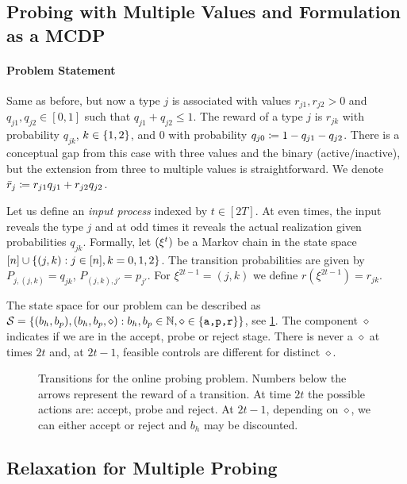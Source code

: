 \subsection{Probing with Multiple Values and Formulation as a MCDP}

\paragraph{Problem Statement}
Same as before, but now a type $j$ is associated with values $r_{j1},r_{j2}>0$ and $q_{j1},q_{j2}\in[0,1]$ such that $q_{j1}+q_{j2}\leq 1$.
The reward of a type $j$ is $r_{jk}$ with probability $q_{jk}$, $k\in\{1,2\}$, and $0$ with probability $q_{j0}\coloneqq1-q_{j1}-q_{j2}$.
There is a conceptual gap from this case with three values and the binary (active/inactive), but the extension from three to multiple values is straightforward.
We denote $\bar r_j\coloneqq r_{j1}q_{j1}+r_{j2}q_{j2}$.

Let us define an \emph{input process} indexed by $t\in[2T]$.
At even times, the input reveals the type $j$ and at odd times it reveals the actual realization given probabilities $q_{jk}$.
Formally, let $(\xi^t)$ be a Markov chain in the state space $[n]\cup\{(j,k):j\in[n],k=0,1,2\}$.
The transition probabilities are given by $P_{j,(j,k)}=q_{jk}$, $P_{(j,k),j'}=p_{j'}$.
For $\xi^{2t-1}=(j,k)$ we define $r(\xi^{2t-1})=r_{jk}$.

The state space for our problem can be described as $\mathcal{S}=\{(b_h,b_p),(b_h,b_p,\diamond):b_h,b_p\in\mathbb{N},\diamond\in \{\texttt{a,p,r}\}\}$, see \cref{fig:probing_states}.
The component $\diamond$ indicates if we are in the accept, probe or reject stage.
There is never a $\diamond$ at times $2t$ and, at $2t-1$, feasible controls are different for distinct $\diamond$.

\begin{figure}
\centering
\scalebox{0.9}{%

}
\caption{Transitions for the online probing problem. 
Numbers below the arrows represent the reward of a transition.
At time $2t$ the possible actions are: accept, probe and reject.
At $2t-1$, depending on $\diamond$, we can either accept or reject and $b_h$ may be discounted.
}
\label{fig:probing_states}
\end{figure}




\subsection{Relaxation for Multiple Probing}

